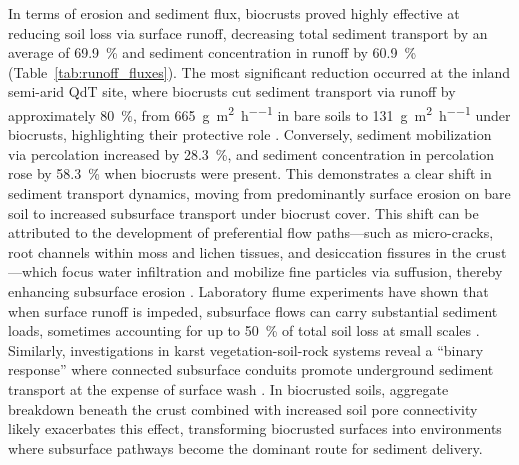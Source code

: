 In terms of erosion and sediment flux, biocrusts proved highly effective at reducing soil loss via surface runoff, decreasing total sediment transport by an average of \SI{69.9}{\percent} and sediment concentration in runoff by \SI{60.9}{\percent} (Table~\ref{tab:runoff_fluxes}). The most significant reduction occurred at the inland semi-arid QdT site, where biocrusts cut sediment transport via runoff by approximately \SI{80}{\percent}, from \SI{665}{\gram\per\metre\squared\per\hour} in bare soils to \SI{131}{\gram\per\metre\squared\per\hour} under biocrusts, highlighting their protective role \citep{RodriguezCaballero2018}. Conversely, sediment mobilization via percolation increased by \SI{28.3}{\percent}, and sediment concentration in percolation rose by \SI{58.3}{\percent} when biocrusts were present. This demonstrates a clear shift in sediment transport dynamics, moving from predominantly surface erosion on bare soil to increased subsurface transport under biocrust cover. This shift can be attributed to the development of preferential flow paths—such as micro-cracks, root channels within moss and lichen tissues, and desiccation fissures in the crust—which focus water infiltration and mobilize fine particles via suffusion, thereby enhancing subsurface erosion \citep{Kogler2025}. Laboratory flume experiments have shown that when surface runoff is impeded, subsurface flows can carry substantial sediment loads, sometimes accounting for up to \SI{50}{\percent} of total soil loss at small scales \citep{Kogler2025}. Similarly, investigations in karst vegetation-soil-rock systems reveal a “binary response” where connected subsurface conduits promote underground sediment transport at the expense of surface wash \citep{Jing2025}. In biocrusted soils, aggregate breakdown beneath the crust combined with increased soil pore connectivity likely exacerbates this effect, transforming biocrusted surfaces into environments where subsurface pathways become the dominant route for sediment delivery.


